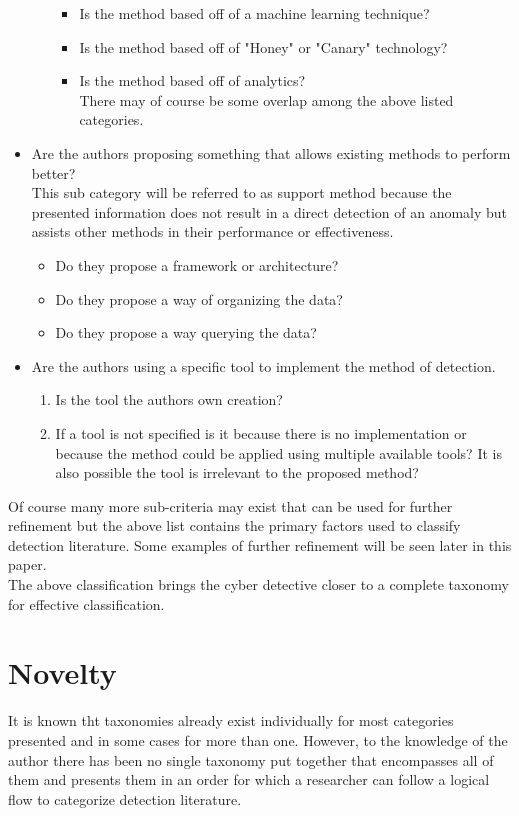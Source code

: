 \documentclass[10pt]{IEEEtran}
\begin{document}
\begin{itemize}
\begin{itemize}
            \begin{itemize}
                \item Is the method based off of a machine learning technique?
                \item Is the method based off of "Honey" or "Canary" technology?
                \item Is the method based off of analytics?\\
            There may of course be some overlap among the above listed categories.
            \end{itemize}
        \end{itemize}
    \item Are the authors proposing something that allows existing methods to perform better?\\
    This sub category will be referred to as support method because the presented information does not result in a direct detection of an anomaly but assists other methods in their performance or effectiveness.
    \begin{itemize}
        \item Do they propose a framework or architecture?
        \item Do they propose a way of organizing the data?
        \item Do they propose a way querying the data?
    \end{itemize}
    \item Are the authors using a specific tool to implement the method of detection.
    \begin{enumerate}
        \item Is the tool the authors own creation? 
        \item If a tool is not specified is it because there is no implementation or because the method could be applied using multiple available tools? It is also possible the tool is irrelevant to the proposed method?
    \end{enumerate}
\end{itemize}
Of course many more sub-criteria may exist that can be used for further refinement but the above list contains the primary factors used to classify detection literature. Some examples of further refinement will be seen later in this paper.\\
The above classification brings the cyber detective closer to a complete taxonomy for effective classification.

\section{Novelty} It is known tht taxonomies already exist individually for most categories presented and in some cases for more than one. However, to the knowledge of the author there has been no single taxonomy put together that encompasses all of them and presents them in an order for which a researcher can follow a logical flow to categorize detection literature.
\end{document}
